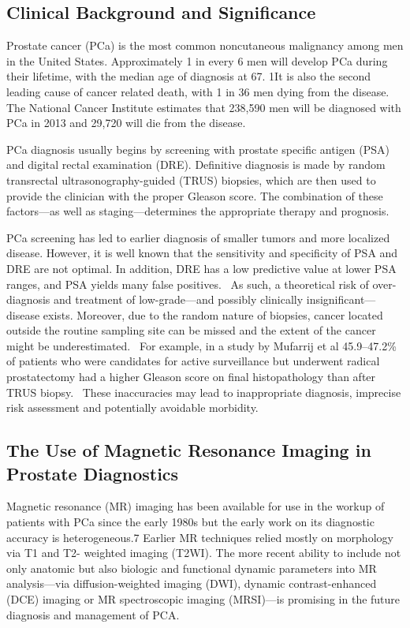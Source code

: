 ﻿\subsection{Clinical Background and Significance}
Prostate cancer (PCa) is the most common noncutaneous malignancy among men in
the United States. Approximately 1 in every 6 men will develop PCa during their
lifetime, with the median age of diagnosis at 67. 1It is also the second
leading cause of cancer related death, with 1 in 36 men dying from the disease.
The National Cancer Institute estimates that 238,590 men will be diagnosed with
PCa in 2013 and 29,720 will die from the disease.~\cite{Howlader2011}

PCa diagnosis usually begins by screening with prostate specific antigen (PSA)
and digital rectal examination (DRE).  Definitive diagnosis is made by random
transrectal ultrasonography-guided (TRUS) biopsies, which are then used to
provide the clinician with the proper Gleason score. The combination of these
factors—as well as staging—determines the appropriate therapy and prognosis. 

PCa screening has led to earlier diagnosis of smaller tumors and more localized
disease.  However, it is well known that the sensitivity and specificity of PSA
and DRE are not optimal. In addition, DRE has a low predictive value at lower
PSA ranges, and PSA yields many false
positives.~\cite{Gosselaar2007,Gupta2013,Hricak2007} As such, a theoretical
risk of over-diagnosis and treatment of low-grade—and possibly clinically
insignificant—disease exists. Moreover, due to the random nature of biopsies,
cancer located outside the routine sampling site can be missed and the extent
of the cancer might be underestimated.~\cite{Gupta2013,Cornud1012} For example,
in a study by Mufarrij et al 45.9--47.2\% of patients who were candidates for
active surveillance but underwent radical prostatectomy had a higher Gleason
score on final histopathology than after TRUS biopsy.~\cite{Mufarrij2010} These
inaccuracies may lead to inappropriate diagnosis, imprecise risk assessment and
potentially avoidable morbidity.

\subsection*{The Use of Magnetic Resonance Imaging in Prostate Diagnostics}
Magnetic resonance (MR) imaging has been available for use in the workup of
patients with PCa since the early 1980s but the early work on its diagnostic
accuracy is heterogeneous.7 Earlier MR techniques relied mostly on morphology
via T1 and T2- weighted imaging (T2WI). The more recent ability to include not
only anatomic but also biologic and functional dynamic parameters into MR
analysis—via diffusion-weighted imaging (DWI), dynamic contrast-enhanced (DCE)
imaging or MR spectroscopic imaging (MRSI)—is promising in the future diagnosis
and management of PCA.

